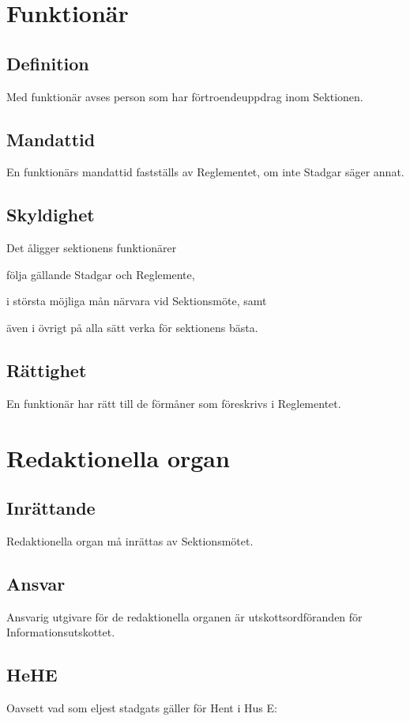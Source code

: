 \documentclass[10pt]{article}
\begin{document}
\section{Funktionär}
\subsection{Definition}
Med funktionär avses person som har förtroendeuppdrag inom Sektionen.

\subsection{Mandattid}
En funktionärs mandattid fastställs av Reglementet, om inte Stadgar säger
annat.

\subsection{Skyldighet}
Det åligger sektionens funktionärer
\begin{attlist}
\item följa gällande Stadgar och Reglemente,
\item i största möjliga mån närvara vid Sektionsmöte, samt
\item även i övrigt på alla sätt verka för sektionens bästa.
\end{attlist}

\subsection{Rättighet}
En funktionär har rätt till de förmåner som föreskrivs i Reglementet.
\newpage

\section{Redaktionella organ}
\subsection{Inrättande}
Redaktionella organ må inrättas av Sektionsmötet.

\subsection{Ansvar}
Ansvarig utgivare för de redaktionella organen är utskottsordföranden för Informationsutskottet.

\subsection{HeHE}
Oavsett vad som eljest stadgats gäller för Hent i Hus E:
\end{document}
